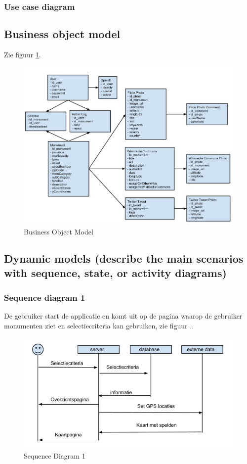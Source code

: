 \documentclass[a4paper,10pt]{article}
\begin{document}
	\subsubsection{Use case diagram}
	
	
	\subsection{Business object model}
		Zie figuur \ref{bom}.
		\begin{figure}[ht!]
			\centering
			\includegraphics[width=\textwidth]{BusinessObjectModel.png}
			\caption{Business Object Model \label{bom}}
		\end{figure}
		\subsection{Dynamic models (describe the main scenarios with sequence, state, or activity diagrams)}
			\subsubsection{Sequence diagram 1}
			De gebruiker start de applicatie en komt uit op de pagina waarop de gebruiker monumenten ziet en selectiecriteria kan gebruiken, zie figuur .. %
			\begin{figure}[ht!]
				\centering
				\includegraphics[width=\textwidth]{sequence1.png}
				\caption{Sequence Diagram 1 \label{sequence1}}
			\end{figure}
\end{document}
